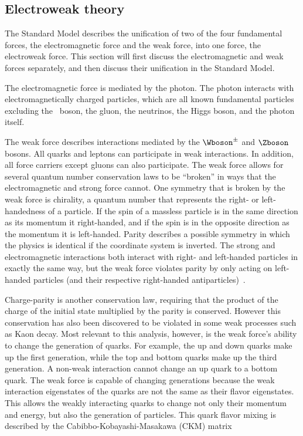 

\subsection{Electroweak theory}

The Standard Model describes the unification of two of the four fundamental forces, the electromagnetic force and the weak force, into one force, the electroweak force. This section will first discuss the electromagnetic and weak forces separately, and then discuss their unification in the Standard Model.

The electromagnetic force is mediated by the photon. The photon interacts with electromagnetically charged particles, which are all known fundamental particles excluding the \Zboson\ boson, the gluon, the neutrinos, the Higgs boson, and the photon itself. 

The weak force describes interactions mediated by the $\Wboson^\pm$ and $\Zboson$ bosons. All quarks and leptons can participate in weak interactions. In addition, all force carriers except gluons can also participate. The weak force allows for several quantum number conservation laws to be ``broken'' in ways that the electromagnetic and strong force cannot. One symmetry that is broken by the weak force is chirality, a quantum number that represents the right- or left-handedness of a particle. If the spin of a massless particle is in the same direction as its momentum it right-handed, and if the spin is in the opposite direction as the momentum it is left-handed. Parity describes a possible symmetry in which the physics is identical if the coordinate system is inverted. The strong and electromagnetic interactions both interact with right- and left-handed particles in exactly the same way, but the weak force violates parity by only acting on left-handed particles (and their respective right-handed antiparticles)~\cite{PDG}. 

Charge-parity is another conservation law, requiring that the product of the charge of the initial state multiplied by the parity is conserved. However this conservation has also been discovered to be violated in some weak processes such as Kaon decay. Most relevant to this analysis, however, is the weak force's ability to change the generation of quarks. For example, the up and down quarks make up the first generation, while the top and bottom quarks make up the third generation. A non-weak interaction cannot change an up quark to a bottom quark. The weak force is capable of changing generations because the weak interaction eigenstates of the quarks are not the same as their flavor eigenstates. This allows the weakly interacting quarks to change not only their momentum and energy, but also the generation of particles. This quark flavor mixing is described by the Cabibbo-Kobayashi-Masakawa (CKM) matrix~\cite{Griffiths,PDG}

